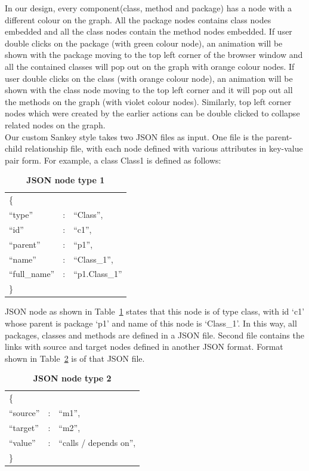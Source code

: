 In our design, every component(class, method and package) has a node with a different colour on the graph. All the package nodes contains class nodes embedded and all the class nodes contain the method nodes embedded. If user double clicks on the package (with green colour node), an animation will be shown with the package moving to the top left corner of the browser window and all the contained classes will pop out on the graph with orange colour nodes. If user double clicks on the class (with orange colour node), an animation will be shown with the class node moving to the top left corner and it will pop out all the methods on the graph (with violet colour nodes). Similarly, top left corner nodes which were created by the earlier actions can be double clicked to collapse related nodes on the graph.\\

Our custom Sankey style takes two JSON files as input. One file is the parent-child relationship file, with each node defined with various attributes in key-value pair form. For example, a class Class1 is defined as follows:

\begin{table}[h]
    \centering
    \begin{tabular}{lll}
        \{\\
        ``type'' & : & ``Class'',\\
        ``id'' & : & ``c1'',\\
        ``parent'' & : & ``p1'',\\
        ``name'' & : & ``Class\_1'',\\
        ``full\_name'' & :& ``p1.Class\_1''\\ 
        \}
    \end{tabular}
    \caption{\textbf{JSON node type 1}}
    \label{tab:node1}
\end{table}
  
 JSON node as shown in Table~\ref{tab:node1} states that this node is of type class, with id `c1' whose parent is package `p1' and name of this node is `Class\_1'. In this way, all packages, classes and methods are defined in a JSON file. Second file contains the links with source and target nodes defined in another JSON format. Format shown in Table~\ref{tab:node2} is of that JSON file.

\begin{table}[h!]
    \centering
    \begin{tabular}{lll}
        \{\\
        ``source'' & : & ``m1'',\\
        ``target'' & : & ``m2'',\\
        ``value'' & : & ``calls / depends on'',\\
        \}
    \end{tabular}
    \caption{\textbf{JSON node type 2}}
    \label{tab:node2}
\end{table}

